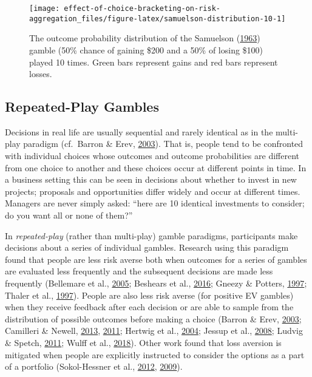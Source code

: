 \documentclass[
  english,
  man, donotrepeattitle,floatsintext]{apa7}
\theoremstyle{definition}
\theoremstyle{definition}
\theoremstyle{definition}
\theoremstyle{definition}
\theoremstyle{remark}
\begin{document}
\begin{figure}
\texttt{[image: effect-of-choice-bracketing-on-risk-aggregation\_files/figure-latex/samuelson-distribution-10-1]} \caption{The outcome probability distribution of the Samuelson (\protect\hyperlink{ref-samuelson1963}{1963}) gamble (50\% chance of gaining \$200 and a 50\% of losing \$100) played 10 times. Green bars represent gains and red bars represent losses.}\label{fig:samuelson-distribution-10}
\end{figure}

\hypertarget{repeated-play-gambles}{%
\subsection{Repeated-Play Gambles}\label{repeated-play-gambles}}

Decisions in real life are usually sequential and rarely identical as in the
multi-play paradigm (cf.~Barron \& Erev, \protect\hyperlink{ref-barron2003}{2003}). That is, people tend to be confronted
with individual choices whose outcomes and outcome probabilities are different
from one choice to another and these choices occur at different points in time.
In a business setting this can be seen in decisions about whether to invest in
new projects; proposals and opportunities differ widely and occur at different
times. Managers are never simply asked: ``here are 10 identical investments to
consider; do you want all or none of them?''

In \emph{repeated-play} (rather than multi-play) gamble paradigms, participants make
decisions about a series of individual gambles. Research using this paradigm
found that people are less risk averse both when outcomes for a series of
gambles are evaluated less frequently and the subsequent decisions are made less
frequently (Bellemare et al., \protect\hyperlink{ref-bellemare2005}{2005}; Beshears et al., \protect\hyperlink{ref-beshears2016}{2016}; Gneezy \& Potters, \protect\hyperlink{ref-gneezy1997}{1997}; Thaler et al., \protect\hyperlink{ref-thaler1997}{1997}). People are
also less risk averse (for positive EV gambles) when they receive feedback after
each decision or are able to sample from the distribution of possible outcomes
before making a choice (Barron \& Erev, \protect\hyperlink{ref-barron2003}{2003}; Camilleri \& Newell, \protect\hyperlink{ref-camilleri2013}{2013}, \protect\hyperlink{ref-camilleri2011}{2011}; Hertwig et al., \protect\hyperlink{ref-hertwig2004}{2004}; Jessup et al., \protect\hyperlink{ref-jessup2008}{2008}; Ludvig \& Spetch, \protect\hyperlink{ref-ludvig2011}{2011}; Wulff et al., \protect\hyperlink{ref-wulff2018}{2018}). Other work found that loss aversion is
mitigated when people are explicitly instructed to consider the options as a
part of a portfolio (Sokol-Hessner et al., \protect\hyperlink{ref-sokolhessner2012}{2012}, \protect\hyperlink{ref-sokolhessner2009}{2009}).
\end{document}
